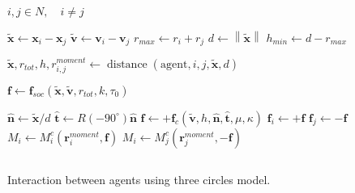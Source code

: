 \begin{algorithm}[H]
\begin{algorithmic}[1]
\REQUIRE $ i,j \in N, \quad i \neq j $
\ENSURE

\STATE $ \tilde{\mathbf{x}} \gets \mathbf{x}_{i} - \mathbf{x}_{j} $
\STATE $ \tilde{\mathbf{v}} \gets \mathbf{v}_{i} - \mathbf{v}_{j} $
\STATE $ r_{max} \gets r_{i} + r_{j} $ 
\STATE $ d \gets \left\|\tilde{\mathbf{x}}\right\| $
\STATE $ h_{min} \gets d - r_{max} $
\STATE 

\STATE $ \tilde{\mathbf{x}}, r_{tot}, h, r_{i,j}^{moment} \gets \operatorname{distance}(\mathrm{agent}, i, j, \tilde{\mathbf{x}}, d) $
\STATE

\STATE $ \mathbf{f} \gets \mathbf{f}_{soc}(\tilde{\mathbf{x}}, \tilde{\mathbf{v}}, r_{tot}, k, \tau_{0}) $

\STATE

\STATE $ \hat{\mathbf{n}} \gets \tilde{\mathbf{x}} / d $
\STATE $ \hat{\mathbf{t}} \gets R(-90^{\circ}) \hat{\mathbf{n}} $
\STATE $ \mathbf{f} \gets +\mathbf{f}_{c}(\tilde{\mathbf{v}}, h, \hat{\mathbf{n}}, \hat{\mathbf{t}}, \mu, \kappa) $
\ENDIF
\STATE
\STATE $ \mathbf{f}_{i} \gets +\mathbf{f} $
\STATE $ \mathbf{f}_{j} \gets -\mathbf{f} $
\STATE
\STATE $ M_{i} \gets M_{i}^{c}(\mathbf{r}_{i}^{moment}, \mathbf{f}) $
\STATE $ M_{i} \gets M_{j}^{c}(\mathbf{r}_{j}^{moment}, -\mathbf{f}) $
\ENDIF

\ENDIF
\STATE $  $
\end{algorithmic}
\caption{Interaction between agents using three circles model.}
\end{algorithm}
